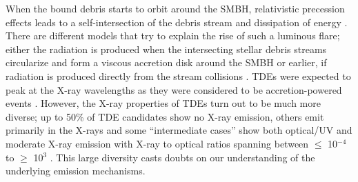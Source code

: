 \documentclass[structabstract]{aa}
\begin{document}
When the bound debris starts to orbit around the SMBH, relativistic precession effects leads to a self-intersection of the debris stream and dissipation of energy \citep{Strubbe2009,Shiokawa2015,Guillochon2015,Bonnerot2020}. There are different models that try to explain the rise of such a luminous flare; either the radiation is produced when the intersecting stellar debris streams circularize and form a viscous accretion disk around the SMBH \citep{Rees1988,Phinney1989} or earlier, if radiation is produced directly from the stream collisions \citep{Piran2015,Jiang2016}. TDEs were expected to peak at the X-ray wavelengths as they were considered to be accretion-powered events \citep{Komossa2002}. %
However, the X-ray properties of TDEs turn out to be much more diverse; up to 50\% of TDE candidates show no X-ray emission, others emit primarily in the X-rays and some ``intermediate cases'' show both optical/UV and moderate X-ray emission with X-ray to optical ratios spanning between $\leq$ 10$^{-4}$ to $\geq$ 10$^{3}$ \citep{Auchettl2017}. This large diversity casts doubts on our understanding of the underlying emission mechanisms. 
\end{document}
